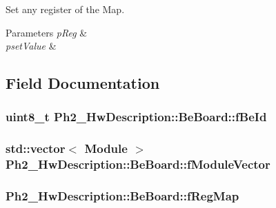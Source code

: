 Set any register of the Map. 


\begin{DoxyParams}{Parameters}
{\em p\-Reg} & \\
\hline
{\em pset\-Value} & \\
\hline
\end{DoxyParams}


\subsection{Field Documentation}
\hypertarget{class_ph2___hw_description_1_1_be_board_aabe1a515a23ff8813d4641293a8b4ba1}{
\subsubsection[{f\-Be\-Id}]{\setlength{\rightskip}{0pt plus 5cm}uint8\-\_\-t Ph2\-\_\-\-Hw\-Description\-::\-Be\-Board\-::f\-Be\-Id}}\label{class_ph2___hw_description_1_1_be_board_aabe1a515a23ff8813d4641293a8b4ba1}
\hypertarget{class_ph2___hw_description_1_1_be_board_adcee78870a20c92fc8c060ff709a4baf}{
\subsubsection[{f\-Module\-Vector}]{\setlength{\rightskip}{0pt plus 5cm}std\-::vector$<$ {\bf Module} $>$ Ph2\-\_\-\-Hw\-Description\-::\-Be\-Board\-::f\-Module\-Vector\hspace{0.3cm}{\ttfamily [protected]}}}\label{class_ph2___hw_description_1_1_be_board_adcee78870a20c92fc8c060ff709a4baf}
\hypertarget{class_ph2___hw_description_1_1_be_board_a6db4850485715c0f23c97c3d621a781b}{
\subsubsection[{f\-Reg\-Map}]{ Ph2\-\_\-\-Hw\-Description\-::\-Be\-Board\-::f\-Reg\-Map\hspace{0.3cm}{\ttfamily [protected]}}}\label{class_ph2___hw_description_1_1_be_board_a6db4850485715c0f23c97c3d621a781b}
